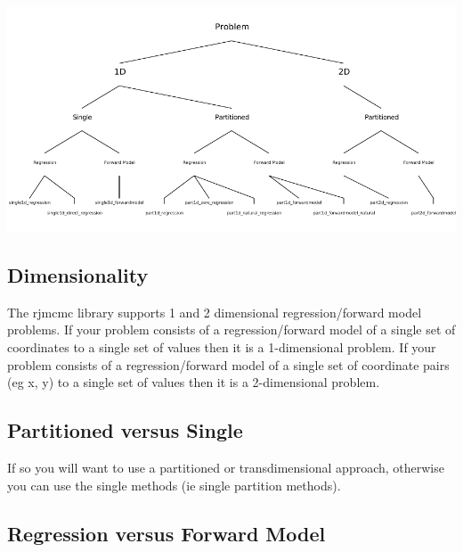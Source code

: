  
\begin{DoxyImageNoCaption}
  \mbox{\includegraphics[width=\textwidth,height=\textheight/2,keepaspectratio=true]{main_tree}}
\end{DoxyImageNoCaption}
\hypertarget{index_Dimensionality}{}\subsection{Dimensionality}\label{index_Dimensionality}
The rjmcmc library supports 1 and 2 dimensional regression/forward model problems. If your problem consists of a regression/forward model of a single set of coordinates to a single set of values then it is a 1-\/dimensional problem. If your problem consists of a regression/forward model of a single set of coordinate pairs (eg x, y) to a single set of values then it is a 2-\/dimensional problem.\hypertarget{index_Partitioned}{}\subsection{Partitioned versus Single}\label{index_Partitioned}
If so you will want to use a partitioned or transdimensional approach, otherwise you can use the single methods (ie single partition methods).\hypertarget{index_Regression}{}\subsection{Regression versus Forward Model}\label{index_Regression}
